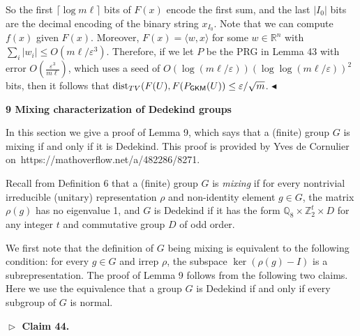 So the first $\lceil\log m\ell\rceil$ bits of $F(x)$ encode the first sum, and the last $\lvert I_{0}\rvert$ bits are the decimal encoding of the binary string $x_{I_{0}}$.
Note that we can compute $f(x)$ given $F(x)$.
Moreover, $F(x)=\langle w,x\rangle$ for some $w\in\mathbb{R}^{n}$ with $\sum_{i}\lvert w_{i}\rvert\leq O(m\ell/\varepsilon^{3})$.
Therefore, if we let $P$ be the PRG in Lemma 43 with error $O(\frac{\varepsilon^{3}}{m\ell})$, which uses a seed of $O(\log(m\ell/\varepsilon))(\log\log(m\ell/\varepsilon))^{2}$ bits, then it follows that $\textnormal{dist}_{TV}(F(U),F(P_{\mathsf{GKM}}(U))\leq\varepsilon/\sqrt{m}$.
$\blacktriangleleft$\par







\par\medskip\noindent\textbf{
9 Mixing characterization of Dedekind groups}\par




In this section we give a proof of Lemma 9, which says that a (finite) group $G$ is mixing if and only if it is Dedekind.
This proof is provided by Yves de Cornulier on https://mathoverflow.net/a/482286/8271.\par




Recall from Definition 6 that a (finite) group $G$ is \emph{mixing} if for every nontrivial irreducible (unitary) representation $\rho$ and non-identity element $g\in G$, the matrix $\rho(g)$ has no eigenvalue 1, and $G$ is Dedekind if it has the form $\mathbb{Q}_{8}\times\mathbb{Z}_{2}^{t}\times D$ for any integer $t$ and commutative group $D$ of odd order.\par




We first note that the definition of $G$ being mixing is equivalent to the following condition: for every $g\in G$ and irrep $\rho$, the subspace $\ker(\rho(g)-I)$ is a subrepresentation.
The proof of Lemma 9 follows from the following two claims.
Here we use the equivalence that a group $G$ is Dedekind if and only if every subgroup of $G$ is normal.\par





\par\medskip\noindent\textbf{
$\vartriangleright$ Claim 44. }\par



